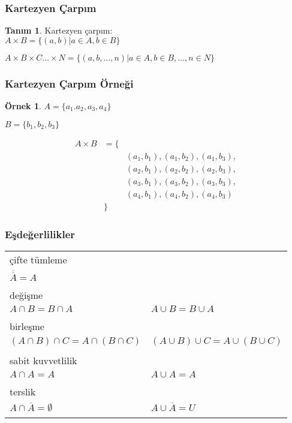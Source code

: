 \documentclass[dvipsnames]{beamer}
\theoremstyle{definition}
\newtheorem{tanim}[theorem]{Tanım}
\theoremstyle{example}
\newtheorem{ornek}[theorem]{Örnek}
\theoremstyle{plain}
\begin{document}
\begin{frame}
  \frametitle{Kartezyen Çarpım}

  \begin{tanim}
    \alert{Kartezyen çarpım}:\\
      $A \times B = \{ (a,b) | a \in A, b \in B \}$

      \medskip
      $A \times B \times C \dots \times N =
        \{ (a,b,\dots,n) | a \in A, b \in B, \dots, n \in N \}$
  \end{tanim}
\end{frame}

\begin{frame}
  \frametitle{Kartezyen Çarpım Örneği}

  \begin{ornek}
    $A = \{a_1.a_2,a_3,a_4\}$

    $B = \{b_1,b_2,b_3\}$

    \medskip
    \begin{eqnarray*}
      A \times B & = \{ & \\
                 &      & (a_1,b_1),(a_1,b_2),(a_1,b_3),\\
                 &      & (a_2,b_1),(a_2,b_2),(a_2,b_3),\\
                 &      & (a_3,b_1),(a_3,b_2),(a_3,b_3),\\
                 &      & (a_4,b_1),(a_4,b_2),(a_4,b_3)\\
                 &  \}  &
    \end{eqnarray*}
  \end{ornek}
\end{frame}

\begin{frame}
  \frametitle{Eşdeğerlilikler}

  \begin{tabular}{ll}
    \alert{çifte tümleme} &\\
      $\overline{\overline{A}} = A$\\\\
    \pause
    \alert{değişme} &\\
      $A \cap B = B \cap A$ &
      $A \cup B = B \cup A$\\\\
    \pause
    \alert{birleşme} &\\
      $(A \cap B) \cap C = A \cap (B \cap C)$ &
      $(A \cup B) \cup C = A \cup (B \cup C)$\\\\
    \pause
    \alert{sabit kuvvetlilik} &\\
      $A \cap A = A$ &
      $A \cup A = A$\\\\
    \pause
    \alert{terslik} &\\
      $A \cap \overline{A} = \emptyset$ &
      $A \cup \overline{A} = U$\\\\
  \end{tabular}
\end{frame}
\end{document}
